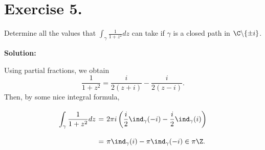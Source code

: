 \section*{Exercise 5.}

Determine all the values that $\displaystyle \int_\gamma \frac{1}{1+z^2}dz$ can take if $\gamma$ is a closed path in $\C \backslash \{\pm i\}$.

\textbf{Solution:}

Using partial fractions, we obtain
\[ \frac{1}{1+z^2} = \frac{i}{2(z+i)} - \frac{i}{2(z-i)}. \]
Then, by some nice integral formula,
\[ \everymath{\displaystyle}
\arraycolsep=1.8pt\def\arraystretch{2.5}
\begin{array}{rcl}
    \int_\gamma \frac{1}{1+z^2} dz & = & 2\pi i \left( \frac{i}{2} \ind_\gamma(-i) - \frac{i}{2} \ind_\gamma(i) \right)\\
    & = & \pi \ind_\gamma(i) - \pi \ind_\gamma(-i) \in \pi \Z.
\end{array}\]
